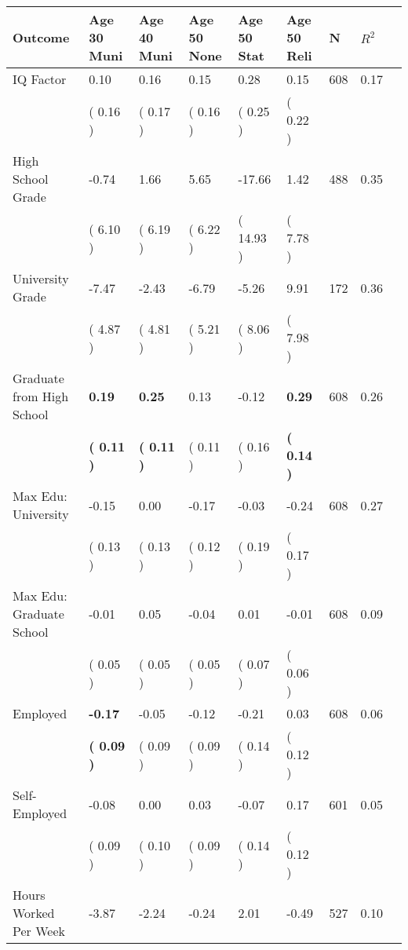 \begin{tabular}{L{6.2cm} C{1.8cm} C{1.8cm} C{1.8cm} C{1.8cm} C{1.8cm} C{1.8cm} C{0.3cm} C{0.3cm}}
\toprule
 \textbf{Outcome} & \textbf{Age 30 Muni} & \textbf{Age 40 Muni} & \textbf{Age 50 None} & \textbf{Age 50 Stat} & \textbf{Age 50 Reli} & \textbf{N} & \textbf{$ R^2$} \\
\midrule
IQ Factor &      0.10 &      0.16 &      0.15 &      0.28 &      0.15  & 608 &       0.17 \\ 
 & (     0.16 ) & (     0.17 ) & (     0.16 ) & (     0.25 ) & (     0.22 )  & \\
High School Grade &     -0.74 &      1.66 &      5.65 &    -17.66 &      1.42  & 488 &       0.35 \\ 
 & (     6.10 ) & (     6.19 ) & (     6.22 ) & (    14.93 ) & (     7.78 )  & \\
University Grade &     -7.47 &     -2.43 &     -6.79 &     -5.26 &      9.91  & 172 &       0.36 \\ 
 & (     4.87 ) & (     4.81 ) & (     5.21 ) & (     8.06 ) & (     7.98 )  & \\
Graduate from High School & \textbf{     0.19} & \textbf{     0.25} &      0.13 &     -0.12 & \textbf{     0.29}  & 608 &       0.26 \\ 
 & \textbf{(     0.11 )} & \textbf{(     0.11 )} & (     0.11 ) & (     0.16 ) & \textbf{(     0.14 )}  & \\
Max Edu: University &     -0.15 &      0.00 &     -0.17 &     -0.03 &     -0.24  & 608 &       0.27 \\ 
 & (     0.13 ) & (     0.13 ) & (     0.12 ) & (     0.19 ) & (     0.17 )  & \\
Max Edu: Graduate School &     -0.01 &      0.05 &     -0.04 &      0.01 &     -0.01  & 608 &       0.09 \\ 
 & (     0.05 ) & (     0.05 ) & (     0.05 ) & (     0.07 ) & (     0.06 )  & \\
Employed & \textbf{    -0.17} &     -0.05 &     -0.12 &     -0.21 &      0.03  & 608 &       0.06 \\ 
 & \textbf{(     0.09 )} & (     0.09 ) & (     0.09 ) & (     0.14 ) & (     0.12 )  & \\
Self-Employed &     -0.08 &      0.00 &      0.03 &     -0.07 &      0.17  & 601 &       0.05 \\ 
 & (     0.09 ) & (     0.10 ) & (     0.09 ) & (     0.14 ) & (     0.12 )  & \\
Hours Worked Per Week &     -3.87 &     -2.24 &     -0.24 &      2.01 &     -0.49  & 527 &       0.10 \\ 

\end{tabular}
